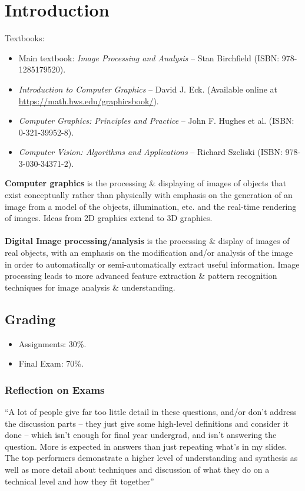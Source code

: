 \documentclass[a4paper,11pt]{article}
\begin{document}
\newpage
\tableofcontents
\newpage
\setcounter{page}{1}

\section{Introduction}
Textbooks:
\begin{itemize}
    \item   Main textbook: \textit{Image Processing and Analysis} -- Stan Birchfield (ISBN: 978-1285179520).
    \item   \textit{Introduction to Computer Graphics} -- David J. Eck. (Available online at \url{https://math.hws.edu/graphicsbook/}).
    \item   \textit{Computer Graphics: Principles and Practice} -- John F. Hughes et al. (ISBN: 0-321-39952-8).
    \item   \textit{Computer Vision: Algorithms and Applications} -- Richard Szeliski (ISBN: 978-3-030-34371-2).
\end{itemize}

\textbf{Computer graphics} is the processing \& displaying of images of objects that exist conceptually rather than
physically with emphasis on the generation of an image from a model of the objects, illumination, etc. and the
real-time rendering of images.
Ideas from 2D graphics extend to 3D graphics.
\\\\
\textbf{Digital Image processing/analysis} is the processing \& display of images of real objects, with an emphasis
on the modification and/or analysis of the image in order to automatically or semi-automatically extract useful
information.
Image processing leads to more advanced feature extraction \& pattern recognition techniques for image analysis \&
understanding.

\subsection{Grading}
\begin{itemize}
    \item   Assignments: 30\%.
    \item   Final Exam: 70\%.
\end{itemize}

\subsubsection{Reflection on Exams}
``A lot of people give far too little detail in these questions, and/or don't address the discussion 
parts -- they just give some high-level definitions and consider it done -- which isn't enough for 
final year undergrad, and isn't answering the question.
More is expected in answers than just repeating what's in my slides. 
The top performers demonstrate a higher level of understanding and synthesis as well as more 
detail about techniques and discussion of what they do on a technical level and how they fit 
together''
\end{document}
